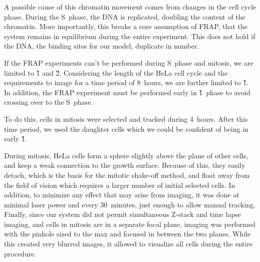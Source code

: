       A possible cause of this chromatin movement comes from changes in
      the cell cycle phase. During the S~phase, the DNA is replicated,
      doubling the content of the chromatin.
      More importantly, this breaks
      a core assumption of FRAP, that the system remains in equilibrium
      during the entire experiment. This does not hold if the DNA, the
      binding sites for our model, duplicate in number.

      If the FRAP experiments can't be performed during S~phase and
      mitosis, we are limited to \G1{} and \G2{}. Considering
      the length of the HeLa cell cycle and the requirements to image
      for a time period of 8~hours, we are further limited to \G1{}.
      In addition, the FRAP experiment must be performed early in
      \G1{}~phase to avoid crossing over to the S~phase.


      To do this, cells in mitosis were selected and tracked during 4~hours.
      After this time period, we used the daughter cells which we could be
      confident of being in early \G1{}.

      During mitosis, HeLa cells form a sphere slightly above the plane of
      other cells, and keep a weak connection to the growth surface.
      Because of this, they easily detach, which is the basis for the
      mitotic shake-off method, and float away from the field of vision
      which requires a larger number
      of initial selected cells. In addition, to minimize any effect that
      may arise from imaging, it was done at minimal laser power and every
      30~minutes, just enough to allow manual tracking.
      Finally, since our system did not permit simultaneous Z-stack and time
      lapse imaging, and cells in mitosis are in a separate focal plane,
      imaging was performed with the pinhole sized to the max and focused
      in between the two planes. While this
      created very blurred images, it allowed to visualize all cells during
      the entire procedure.

